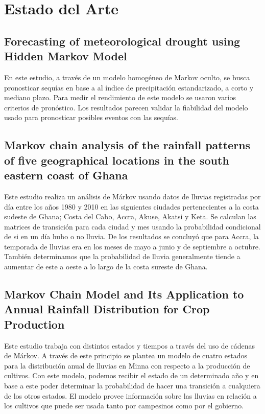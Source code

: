 \documentclass{article}
\begin{document}
\section{Estado del Arte}

\subsection{Forecasting of meteorological drought using Hidden Markov Model}

En este estudio, a través de un modelo homogéneo de Markov oculto, se busca pronosticar sequías en base a al índice de precipitación estandarizado, a corto y mediano plazo. Para medir el rendimiento de este modelo  se usaron varios criterios de pronóstico. Los resultados parecen validar la fiabilidad del modelo usado para pronosticar posibles eventos con las sequías.

\subsection{Markov chain analysis of the rainfall patterns of five geographical locations in the south eastern coast of Ghana}

Este estudio realiza un análisis de Márkov usando datos de lluvias registradas por día entre los años 1980 y 2010 en las siguientes ciudades pertenecientes a la costa sudeste de Ghana; Costa del Cabo, Accra, Akuse, Akatsi y Keta. Se calculan las matrices de transición para cada ciudad y mes usando la probabilidad condicional de si en un día hubo o no lluvia. De los resultados se concluyó que para Accra, la temporada de lluvias era en los meses de mayo a junio y de septiembre a octubre. También determinamos que la probabilidad de lluvia generalmente tiende a aumentar de este a oeste a lo largo de la costa sureste de Ghana.

\subsection{Markov Chain Model and Its Application to Annual Rainfall Distribution for Crop Production}

Este estudio trabaja con distintos estados y tiempos a través del uso de cádenas de Márkov. A través de este principio se plantea un modelo de cuatro estados para la distribución anual de lluvias en Minna con respecto a la producción de cultivos. Con este modelo, podemos recibir el estado de un determinado año y en base a este poder determinar la probabilidad de hacer una transición a cualquiera de los otros estados. El modelo provee información sobre las lluvias en relación a los cultivos que puede ser usada tanto por campesinos como por el gobierno. 
\end{document}
